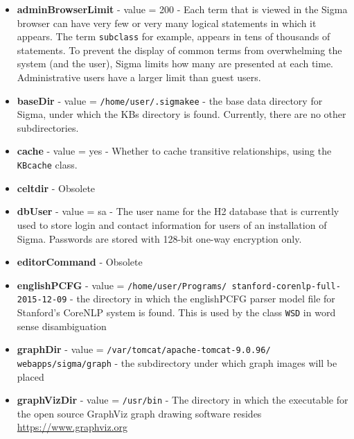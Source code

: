 \documentclass{book}
\begin{document}
\begin{itemize}

\item \textbf{adminBrowserLimit} - value = 200 - Each term that is viewed in the
Sigma browser can have very few or very many logical statements in which it
appears.  The term \texttt{subclass} for example, appears in tens of thousands
of statements.  To prevent the display of common terms from overwhelming the
system (and the user), Sigma limits how many are presented at each time.
Administrative users have a larger limit than guest users.

\item \textbf{baseDir} - value = \texttt{/home/user/.sigmakee} - the base data
directory for Sigma, under which the KBs directory is found.  Currently, there
are no other subdirectories.

\item \textbf{cache} - value = yes - Whether to cache transitive relationships,
using the \texttt{KBcache} class.

\item \textbf{celtdir} - Obsolete

\item \textbf{dbUser} - value = sa - The user name for the H2 database that is
currently used to store login and contact information for users of an
installation of Sigma.  Passwords are stored with 128-bit one-way encryption
only.

\item \textbf{editorCommand}  - Obsolete

\item \begin{sloppypar}\textbf{englishPCFG} - value =
\texttt{/home/user/Programs/ stanford-corenlp-full-2015-12-09} - the directory in
which the englishPCFG parser model file for Stanford's CoreNLP system is found.
This is used by the class \texttt{WSD} in word sense
disambiguation\end{sloppypar}

\item \begin{sloppypar}\textbf{graphDir} - value =
\texttt{/var/tomcat/apache-tomcat-9.0.96/ webapps/sigma/graph} - the subdirectory
under which graph images will be placed\end{sloppypar}

  \item \textbf{graphVizDir} - value = \texttt{/usr/bin} - The directory in which the
executable for the open source GraphViz graph drawing software resides
\url{https://www.graphviz.org}


\end{itemize}
\end{document}
